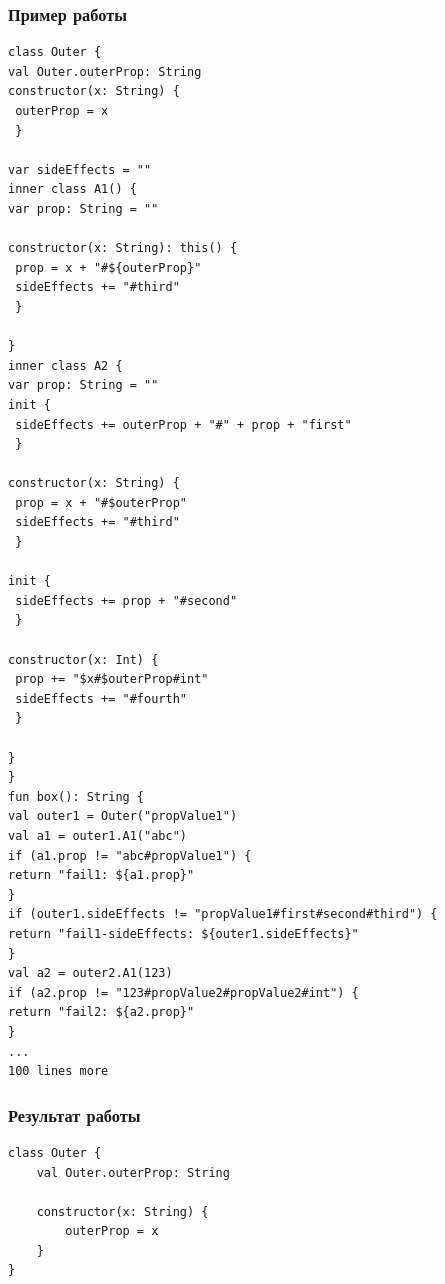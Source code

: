 
\begin{frame}[fragile]
	\frametitle{Пример работы}
	\begin{lstlisting}[basicstyle=\fontsize{4}{1}\selectfont\ttfamily]
class Outer {
val Outer.outerProp: String
constructor(x: String) {
 outerProp = x
 }

var sideEffects = ""
inner class A1() {
var prop: String = ""

constructor(x: String): this() {
 prop = x + "#${outerProp}"
 sideEffects += "#third"
 }

}
inner class A2 {
var prop: String = ""
init {
 sideEffects += outerProp + "#" + prop + "first"
 }

constructor(x: String) {
 prop = x + "#$outerProp"
 sideEffects += "#third"
 }

init {
 sideEffects += prop + "#second"
 }

constructor(x: Int) {
 prop += "$x#$outerProp#int"
 sideEffects += "#fourth"
 }

}
}
fun box(): String {
val outer1 = Outer("propValue1")
val a1 = outer1.A1("abc")
if (a1.prop != "abc#propValue1") {
return "fail1: ${a1.prop}"
}
if (outer1.sideEffects != "propValue1#first#second#third") {
return "fail1-sideEffects: ${outer1.sideEffects}"
}
val a2 = outer2.A1(123)
if (a2.prop != "123#propValue2#propValue2#int") {
return "fail2: ${a2.prop}"
}
...
100 lines more
\end{lstlisting}
	
\end{frame}


\begin{frame}[fragile]
	\frametitle{Результат работы}
	\begin{lstlisting}[basicstyle=\small]
class Outer {
    val Outer.outerProp: String

    constructor(x: String) {
        outerProp = x
    }
}
\end{lstlisting}
	
\end{frame}



